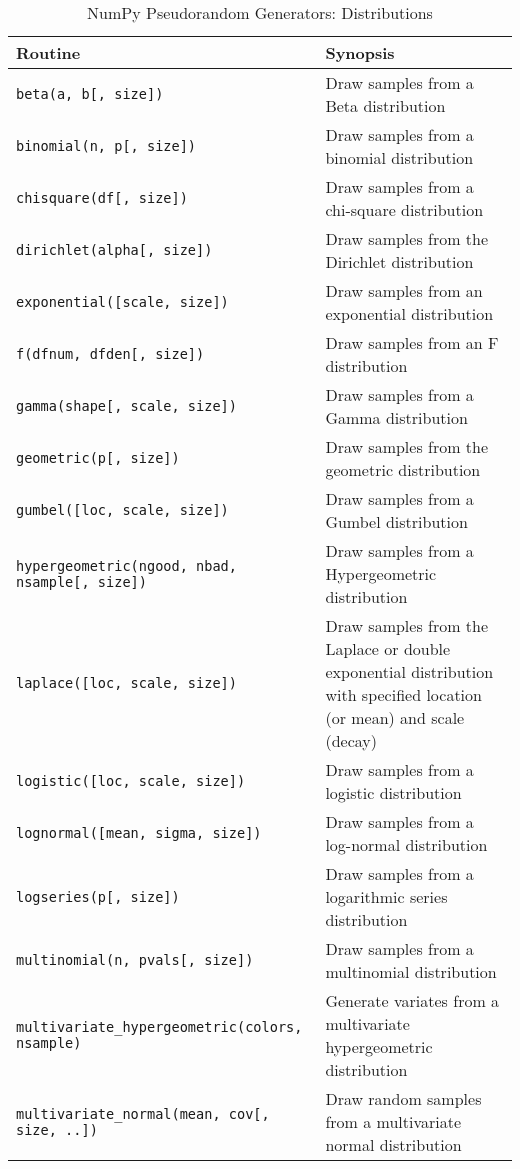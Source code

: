 \documentclass[a4paper,11pt]{book}
\numberwithin{figure}{chapter}
\numberwithin{table}{chapter}
\begin{document}
\begin{sidewaystable}[!htbp]
	\centering
	\caption{NumPy Pseudorandom Generators: Distributions} 
	\label{tab:random_distros}
	\begin{tabular}{lp{12cm}}
		\toprule \toprule
			Routine & Synopsis \\
			\midrule
\texttt{beta(a, b[, size])} &
                        Draw samples from a Beta distribution\\
\texttt{binomial(n, p[, size])} &
                        Draw samples from a binomial distribution\\
\texttt{chisquare(df[, size])} &
                        Draw samples from a chi-square distribution\\
\texttt{dirichlet(alpha[, size])} &
                        Draw samples from the Dirichlet distribution\\
\texttt{exponential([scale, size])} &
                        Draw samples from an exponential distribution\\
\texttt{f(dfnum, dfden[, size])} &
                        Draw samples from an F distribution\\
\texttt{gamma(shape[, scale, size])} &
                        Draw samples from a Gamma distribution\\
\texttt{geometric(p[, size])} &
                        Draw samples from the geometric distribution\\
\texttt{gumbel([loc, scale, size])} &
                        Draw samples from a Gumbel distribution\\
\texttt{hypergeometric(ngood, nbad, nsample[, size])} &
                        Draw samples from a Hypergeometric distribution\\
\texttt{laplace([loc, scale, size])} &
                        Draw samples from the Laplace or double exponential distribution with specified location (or mean) and scale (decay)\\
\texttt{logistic([loc, scale, size])} &
                        Draw samples from a logistic distribution\\
\texttt{lognormal([mean, sigma, size])} &
                        Draw samples from a log-normal distribution\\
\texttt{logseries(p[, size])} &
                        Draw samples from a logarithmic series distribution\\
\texttt{multinomial(n, pvals[, size])} &
                        Draw samples from a multinomial distribution\\
\texttt{multivariate\_hypergeometric(colors, nsample)} &
                        Generate variates from a multivariate hypergeometric distribution\\
\texttt{multivariate\_normal(mean, cov[, size, ..])} &
                        Draw random samples from a multivariate normal distribution\\
\midrule
		\end{tabular}
\end{sidewaystable}
\end{document}
